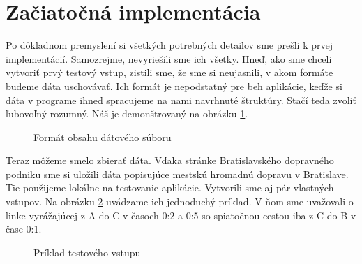 \section{Začiatočná implementácia}

Po dôkladnom premyslení si všetkých potrebných detailov sme prešli k prvej implementácií. Samozrejme, nevyriešili sme ich všetky. Hneď, ako sme chceli vytvoriť prvý testový vstup, zistili sme, že sme si neujasnili, v akom formáte budeme dáta uschovávať. Ich formát je nepodstatný pre beh aplikácie, keďže si dáta v programe ihneď spracujeme na nami navrhnuté štruktúry. Stačí teda zvoliť ľubovoľný rozumný. Náš je demonštrovaný na obrázku \ref{Format_datoveho_suboru}.\newline

\begin{figure}[H]
\caption{Formát obsahu dátového súboru}
\label{Format_datoveho_suboru}
\end{figure}

Teraz môžeme smelo zbierať dáta. Vďaka stránke Bratislavského dopravného podniku sme si uložili dáta popisujúce mestskú hromadnú dopravu v Bratislave. Tie použijeme lokálne na testovanie aplikácie. Vytvorili sme aj pár vlastných vstupov. Na obrázku \ref{priklad_vstupu_1} uvádzame ich jednoduchý príklad. V ňom sme uvažovali o linke vyrážajúcej z A do C v časoch 0:2 a 0:5 so spiatočnou cestou iba z C do B v čase 0:1.\newline

\begin{figure}[H]
\caption{Príklad testového vstupu}
\label{priklad_vstupu_1}
\end{figure}

